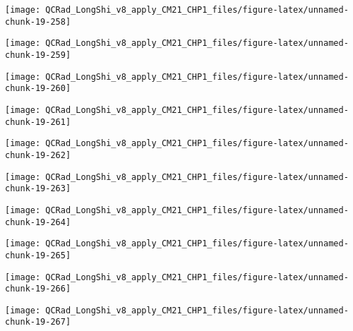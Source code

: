 \documentclass[
  10pt,
  a4paper,oneside]{article}
\begin{document}
\begin{center}\texttt{[image: QCRad\_LongShi\_v8\_apply\_CM21\_CHP1\_files/figure-latex/unnamed-chunk-19-258]} \end{center}

\begin{center}\texttt{[image: QCRad\_LongShi\_v8\_apply\_CM21\_CHP1\_files/figure-latex/unnamed-chunk-19-259]} \end{center}

\begin{center}\texttt{[image: QCRad\_LongShi\_v8\_apply\_CM21\_CHP1\_files/figure-latex/unnamed-chunk-19-260]} \end{center}

\begin{center}\texttt{[image: QCRad\_LongShi\_v8\_apply\_CM21\_CHP1\_files/figure-latex/unnamed-chunk-19-261]} \end{center}

\begin{center}\texttt{[image: QCRad\_LongShi\_v8\_apply\_CM21\_CHP1\_files/figure-latex/unnamed-chunk-19-262]} \end{center}

\begin{center}\texttt{[image: QCRad\_LongShi\_v8\_apply\_CM21\_CHP1\_files/figure-latex/unnamed-chunk-19-263]} \end{center}

\begin{center}\texttt{[image: QCRad\_LongShi\_v8\_apply\_CM21\_CHP1\_files/figure-latex/unnamed-chunk-19-264]} \end{center}

\begin{center}\texttt{[image: QCRad\_LongShi\_v8\_apply\_CM21\_CHP1\_files/figure-latex/unnamed-chunk-19-265]} \end{center}

\begin{center}\texttt{[image: QCRad\_LongShi\_v8\_apply\_CM21\_CHP1\_files/figure-latex/unnamed-chunk-19-266]} \end{center}

\begin{center}\texttt{[image: QCRad\_LongShi\_v8\_apply\_CM21\_CHP1\_files/figure-latex/unnamed-chunk-19-267]} \end{center}
\end{document}

